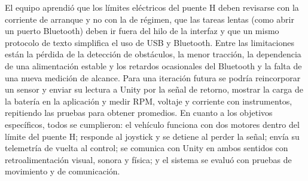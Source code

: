 \documentclass[journal]{IEEEtran}
\begin{document}
El equipo aprendió que los límites eléctricos del puente H deben revisarse con la corriente de arranque y no con la de régimen, que las tareas lentas (como abrir un puerto Bluetooth) deben ir fuera del hilo de la interfaz y que un mismo protocolo de texto simplifica el uso de USB y Bluetooth. Entre las limitaciones están la pérdida de la detección de obstáculos, la menor tracción, la dependencia de una alimentación estable y los retardos ocasionales del Bluetooth y la falta de una nueva medición de alcance. Para una iteración futura se podría reincorporar un sensor y enviar su lectura a Unity por la señal de retorno, mostrar la carga de la batería en la aplicación y medir RPM, voltaje y corriente con instrumentos, repitiendo las pruebas para obtener promedios. En cuanto a los objetivos específicos, todos se cumplieron: el vehículo funciona con dos motores dentro del límite del puente H; responde al joystick y se detiene al perder la señal; envía su telemetría de vuelta al control; se comunica con Unity en ambos sentidos con retroalimentación visual, sonora y física; y el sistema se evaluó con pruebas de movimiento y de comunicación.
\end{document}
